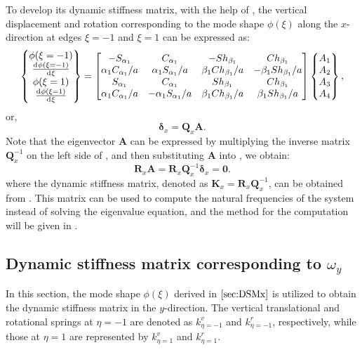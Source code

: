 \documentclass[preprint,12pt]{elsarticle}
\newcommand{\id}{\mathrm{d}\mkern1mu}
\begin{document}
To develop its dynamic stiffness matrix, with the help of , the vertical displacement and rotation corresponding to the mode shape $\phi(\xi)$ along the $x$-direction at edges $\xi = -1$ and $\xi = 1$ can be expressed as:
%
\begin{equation}\label{eq:UBx}
	\begin{split}
		\begin{Bmatrix}
			\phi(\xi=-1)\\\frac{\id \phi(\xi=-1)}{\id \xi}\\\phi(\xi=1)\\\frac{\id \phi(\xi=1)}{\id \xi}
		\end{Bmatrix}
		= \begin{bmatrix}
			-S_{\alpha_1}&C_{\alpha_1}&-Sh_{\beta_1}&Ch_{\beta_1}\\
			\alpha_1 C_{\alpha_1}/a&\alpha_1S_{\alpha_1}/a&\beta_1Ch_{\beta_1}/a&-\beta_1Sh_{\beta_1}/a\\
			S_{\alpha_1}&C_{\alpha_1}&Sh_{\beta_1}&Ch_{\beta_1}\\
			\alpha_1 C_{\alpha_1}/a&-\alpha_1S_{\alpha_1}/a&\beta_1Ch_{\beta_1}/a&\beta_1Sh_{\beta_1}/a
		\end{bmatrix}
		\begin{Bmatrix}
			A_1\\A_2\\A_3\\A_4
		\end{Bmatrix} ,
	\end{split}
\end{equation}
%
or,
%
\begin{equation}\label{eq:UBx1}
	\mathbf{\delta}_x= \mathbf{Q}_x\mathbf{A}.
\end{equation}
%
Note that the eigenvector $\mathbf{A}$ can be expressed by multiplying the inverse matrix $\mathbf{Q}_x^{-1}$ on the left side of , and then substituting $\mathbf{A}$ into , we obtain:
%
\begin{equation}\label{eq:DSM_eqx}
	\mathbf{R}_x \mathbf{A}=\mathbf{R}_x\mathbf{Q}_x^{-1}\mathbf{\delta}_x = \mathbf{0}.
\end{equation}
%
where the dynamic stiffness matrix, denoted as $\mathbf{K}_x = \mathbf{R}_x\mathbf{Q}_x^{-1}$, can be obtained from . 
This matrix can be used to compute the natural frequencies of the system instead of solving the eigenvalue equation, 
and the method for the computation will be given in .

\subsection{Dynamic stiffness matrix corresponding to \(\omega_y\)}\label{sec:DSMy}
In this section, the mode shape \(\phi(\xi)\) derived in \(\Cref{sec:DSMx}\) is utilized to obtain the dynamic stiffness matrix in the \(y\)-direction.  
The vertical translational and rotational springs at \(\eta = -1\) are denoted as \(k^v_{\eta = -1}\) and \(k^r_{\eta = -1}\), respectively, while those at \(\eta = 1\) are represented by \(k^v_{\eta = 1}\) and \(k^r_{\eta = 1}\).
\end{document}
